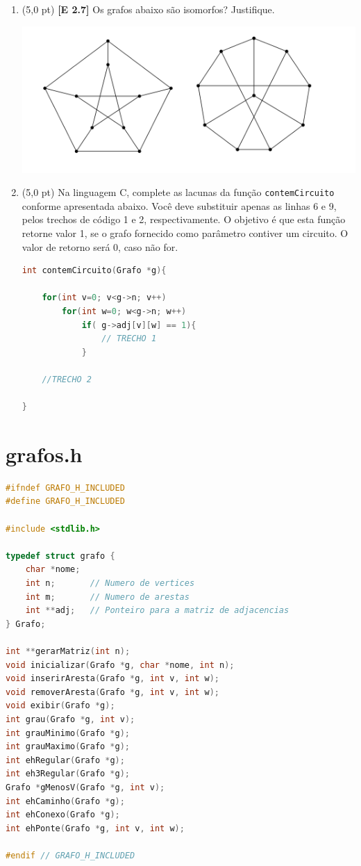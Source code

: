 \documentclass[12pt,a4paper,oneside]{article}
\begin{document}
\begin{enumerate}

	\item (5,0 pt) {\bf [E 2.7]} Os grafos abaixo são isomorfos? Justifique.
	\begin{center}
		\includegraphics[width=\textwidth]{images/grafos.png}
	\end{center}
	
	\item (5,0 pt) Na linguagem C, complete as lacunas da função {\tt contemCircuito} conforme apresentada abaixo. Você deve substituir apenas as linhas 6 e 9, pelos trechos de código 1 e 2, respectivamente. O objetivo é que esta função retorne valor 1, se o grafo fornecido como parâmetro contiver um circuito. O valor de retorno será 0, caso não for.

\begin{lstlisting}[language=C]
int contemCircuito(Grafo *g){

	for(int v=0; v<g->n; v++)
		for(int w=0; w<g->n; w++)
			if( g->adj[v][w] == 1){
				// TRECHO 1
			}
			
	//TRECHO 2
	
}\end{lstlisting}
	
\end{enumerate}

\newpage

\section{grafos.h}

\begin{lstlisting}[language=C]
#ifndef GRAFO_H_INCLUDED
#define GRAFO_H_INCLUDED

#include <stdlib.h>

typedef struct grafo {
	char *nome;
	int n;       // Numero de vertices
	int m;       // Numero de arestas
	int **adj;   // Ponteiro para a matriz de adjacencias
} Grafo;

int **gerarMatriz(int n);
void inicializar(Grafo *g, char *nome, int n);
void inserirAresta(Grafo *g, int v, int w);
void removerAresta(Grafo *g, int v, int w);
void exibir(Grafo *g);
int grau(Grafo *g, int v);
int grauMinimo(Grafo *g);
int grauMaximo(Grafo *g);
int ehRegular(Grafo *g);
int eh3Regular(Grafo *g);
Grafo *gMenosV(Grafo *g, int v);
int ehCaminho(Grafo *g);
int ehConexo(Grafo *g);
int ehPonte(Grafo *g, int v, int w);

#endif // GRAFO_H_INCLUDED\end{lstlisting}
\end{document}
